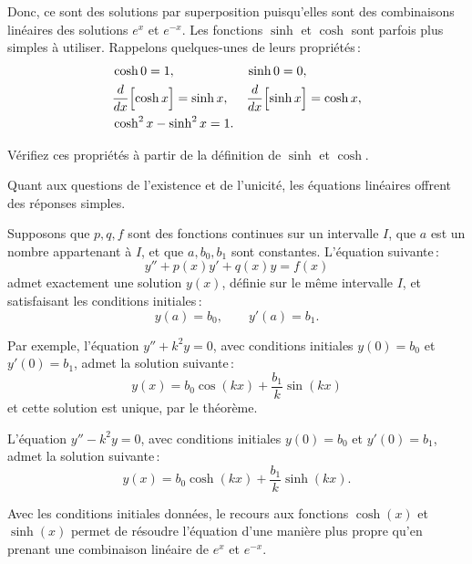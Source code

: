 Donc, ce sont des solutions par superposition puisqu'elles sont des combinaisons linéaires des solutions $e^x$ et $e^{-x}$.   Les fonctions $\sinh$ et $\cosh$ sont parfois plus simples à utiliser.  Rappelons quelques-unes de leurs propriétés\,:
\begin{align*}
& \cosh 0  = 1 , &   & \sinh 0 = 0 , \\
& \frac{d}{dx} \Bigl[ \cosh x \Bigr] = \sinh x , &  & \frac{d}{dx} \Bigl[ \sinh x \Bigr] = \cosh x , \\
& \cosh^2 x - \sinh^2 x = 1 .
\end{align*}


\begin{exercise}
Vérifiez ces propriétés à partir de la définition de $\sinh$
et $\cosh$.
\end{exercise}

Quant aux questions de l'existence et de l'unicité, les équations linéaires offrent des réponses simples.

\begin{theorem}
Supposons que $p, q, f$ sont des fonctions continues sur un intervalle
$I$, que $a$ est un nombre appartenant à $I$,
et que $a, b_0, b_1$ sont constantes.
L'équation suivante\,: 
\begin{equation*}
y'' + p(x) y' + q(x) y = f(x) 
\end{equation*}
admet exactement une solution $y(x)$, définie sur le même intervalle $I$, et satisfaisant les conditions initiales\,: 
\begin{equation*}
y(a) = b_0 , \qquad y'(a) = b_1 .
\end{equation*}
\end{theorem}

Par exemple, l'équation $y'' + k^2 y = 0$, avec conditions initiales $y(0) = b_0$ et $y'(0) = b_1$,
admet la solution suivante\,: 
\begin{equation*}
y(x) = b_0 \cos (kx) + \frac{b_1}{k} \sin (kx) 
\end{equation*}
et cette solution est unique, par le théorème.

L'équation $y'' - k^2 y = 0$, avec conditions initiales $y(0) = b_0$ et $y'(0) = b_1$,
admet la solution suivante\,:
\begin{equation*}
y(x) = b_0 \cosh (kx) + \frac{b_1}{k} \sinh (kx) .
\end{equation*}

Avec les conditions initiales données, le recours aux fonctions $\cosh(x)$ et $\sinh(x)$  permet de résoudre l'équation d'une manière plus propre qu'en prenant une combinaison linéaire de $e^x$ et $e^{-x}$.

